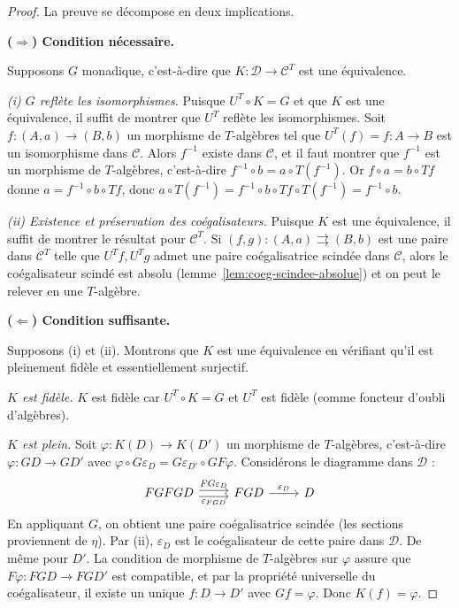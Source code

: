 \begin{proof}
La preuve se décompose en deux implications.

\medskip
\textbf{($\Rightarrow$) Condition nécessaire.}

Supposons $G$ monadique, c'est-à-dire que $K \colon \mathcal{D} \to
\mathcal{C}^T$ est une équivalence.

\emph{(i) $G$ reflète les isomorphismes.}
Puisque $U^T \circ K = G$ et que $K$ est une équivalence,
il suffit de montrer que $U^T$ reflète les isomorphismes.
Soit $f \colon (A, a) \to (B, b)$ un morphisme de $T$-algèbres
tel que $U^T(f) = f \colon A \to B$ est un isomorphisme dans $\mathcal{C}$.
Alors $f^{-1}$ existe dans $\mathcal{C}$, et il faut montrer que
$f^{-1}$ est un morphisme de $T$-algèbres, c'est-à-dire
$f^{-1} \circ b = a \circ T(f^{-1})$.
Or $f \circ a = b \circ Tf$ donne
$a = f^{-1} \circ b \circ Tf$, donc
$a \circ T(f^{-1}) = f^{-1} \circ b \circ Tf \circ T(f^{-1})
= f^{-1} \circ b$.

\emph{(ii) Existence et préservation des coégalisateurs.}
Puisque $K$ est une équivalence, il suffit de montrer le résultat
pour $\mathcal{C}^T$. Si $(f, g) \colon (A,a) \rightrightarrows (B,b)$
est une paire dans $\mathcal{C}^T$ telle que $U^T f, U^T g$ admet
une paire coégalisatrice scindée dans $\mathcal{C}$, alors le coégalisateur
scindé est absolu (lemme~\ref{lem:coeg-scindee-absolue}) et on peut le relever
en une $T$-algèbre.

\medskip
\textbf{($\Leftarrow$) Condition suffisante.}

Supposons (i) et (ii). Montrons que $K$ est une équivalence
en vérifiant qu'il est pleinement fidèle et essentiellement surjectif.

\emph{$K$ est fidèle.}
$K$ est fidèle car $U^T \circ K = G$ et $U^T$ est fidèle
(comme foncteur d'oubli d'algèbres).

\emph{$K$ est plein.}
Soit $\varphi \colon K(D) \to K(D')$ un morphisme de $T$-algèbres,
c'est-à-dire $\varphi \colon GD \to GD'$ avec
$\varphi \circ G\varepsilon_D = G\varepsilon_{D'} \circ GF\varphi$.
Considérons le diagramme dans $\mathcal{D}$ :
\[
\begin{tikzcd}
FGFGD \arrow[r, shift left, "FG\varepsilon_D"] \arrow[r, shift right, "\varepsilon_{FGD}"'] &
FGD \arrow[r, "\varepsilon_D"] & D
\end{tikzcd}
\]
En appliquant $G$, on obtient une paire coégalisatrice scindée
(les sections proviennent de $\eta$). Par (ii), $\varepsilon_D$ est
le coégalisateur de cette paire dans $\mathcal{D}$.
De même pour $D'$. La condition de morphisme de $T$-algèbres sur
$\varphi$ assure que $F\varphi \colon FGD \to FGD'$ est compatible,
et par la propriété universelle du coégalisateur, il existe un unique
$f \colon D \to D'$ avec $Gf = \varphi$. Donc $K(f) = \varphi$.


\end{proof}
